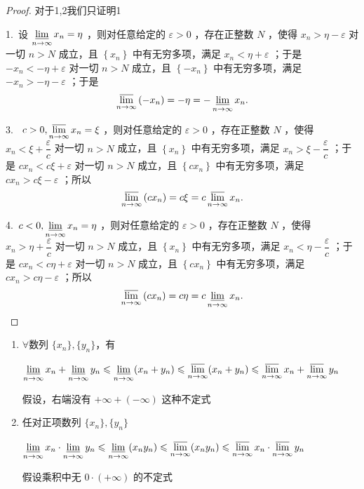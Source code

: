 \begin{proof}
	对于1,2我们只证明1
	
	1.~设 $\varliminf\limits_{n \rightarrow \infty} x_n=\eta$ ，则对任意给定的 $\varepsilon>0$ ，存在正整数 $N$ ，使得 $x_n>\eta-\varepsilon$ 对一切 $n> N$ 成立，且 $\left\{x_n\right\}$ 中有无穷多项，满足 $x_n<\eta+\varepsilon$ ；于是 $-x_n<-\eta+\varepsilon$ 对一切 $n>N$ 成立，且 $\left\{-x_n\right\}$ 中有无穷多项，满足 $-x_n>-\eta-\varepsilon$ ；于是
	$$
	\varlimsup_{n \rightarrow \infty}\left(-x_n\right)=-\eta=-\varliminf\limits _{n \rightarrow \infty} x_n .
	$$
	
	3. ~$c>0, \varlimsup\limits_{n \rightarrow \infty} x_n=\xi$ ，则对任意给定的 $\varepsilon>0$ ，存在正整数 $N$ ，使得 $x_n<\xi+\dfrac{\varepsilon}{c}$ 对一切 $n>N$ 成立，且 $\left\{x_n\right\}$ 中有无穷多项，满足 $x_n>\xi-\dfrac{\varepsilon}{c}$ ；于是 $c x_n<c \xi+\varepsilon$ 对一切 $n>N$ 成立，且 $\left\{c x_n\right\}$ 中有无穷多项，满足 $c x_n>c \xi-\varepsilon$ ；所以
	$$
	\varlimsup_{n \rightarrow \infty}\left(c x_n\right)=c \xi=c \varlimsup_{n \rightarrow \infty} x_n .
	$$
	
	
	4.~$c<0, \varliminf\limits_{n \rightarrow \infty} x_n=\eta$ ，则对任意给定的 $\varepsilon>0$ ，存在正整数 $N$ ，使得 $x_n>\eta+\dfrac{\varepsilon}{c}$ 对一切 $n>N$ 成立，且 $\left\{x_n\right\}$ 中有无穷多项，满足 $x_n<\eta-\dfrac{\varepsilon}{c}$ ；于是 $c x_n<c \eta+\varepsilon$ 对一切 $n>N$ 成立，且 $\left\{c x_n\right\}$ 中有无穷多项，满足 $c x_n>c \eta-\varepsilon$ ；所以
	$$
	\varlimsup_{n \rightarrow \infty}\left(c x_n\right)=c \eta=c \varliminf\limits _{n \rightarrow \infty} x_n .
	$$
\end{proof}
\begin{proposition}\label{3.6.6}
	\begin{enumerate}
		\item $\forall$数列 $\{x_{n}\},\{y_{n}\}$，有
		
		$\varliminf\limits_{n\rightarrow\infty}x_{n}+\varliminf\limits_{n\rightarrow\infty}y_{n}\leqslant\varliminf\limits_{n\rightarrow\infty}(x_{n}+y_{n})\leqslant\varlimsup\limits_{n\rightarrow\infty}(x_{n}+y_{n})\leqslant\varlimsup\limits_{n\rightarrow\infty}x_{n}+\varlimsup\limits_{n\rightarrow\infty}y_{n}$
		
		假设，右端没有 $+\infty +(-\infty)$ 这种不定式
		\item 任对正项数列 $\{x_{n}\},\{y_{n}\}$
		
		$\varliminf\limits_{n\rightarrow\infty}x_{n}\cdot\varliminf\limits_{n\rightarrow\infty}y_{n}\leqslant\varliminf\limits_{n\rightarrow\infty}(x_{n}y_{n})\leqslant\varlimsup\limits_{n\rightarrow\infty}(x_{n}y_{n})\leqslant\varlimsup\limits_{n\rightarrow\infty}x_{n}\cdot\varlimsup\limits_{n\rightarrow\infty}y_{n}$
		
		假设乘积中无 $0\cdot(+\infty)$ 的不定式
	\end{enumerate}
\end{proposition}
